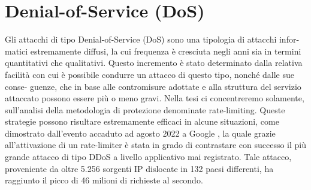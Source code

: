 \section{Denial-of-Service (DoS)}

Gli attacchi di tipo Denial-of-Service (DoS) sono una tipologia di attacchi infor- matici estremamente diffusi, la cui
frequenza è cresciuta negli anni sia in termini quantitativi che qualitativi. Questo incremento è stato determinato
dalla relativa facilità con cui è possibile condurre un attacco di questo tipo, nonché dalle sue conse- guenze, che in
base alle contromisure adottate e alla struttura del servizio attaccato possono essere più o meno gravi. Nella tesi ci
concentreremo solamente, sull’analisi della metodologia di protezione denominate rate-limiting. Queste strategie possono
risultare estremamente efficaci in alcune situazioni, come dimostrato dall’evento accaduto ad agosto 2022 a Google \cite{google_ddos},
la quale grazie all’attivazione di un rate-limiter è stata in grado di contrastare con successo il più grande attacco di tipo
DDoS a livello applicativo mai registrato. Tale attacco, proveniente da oltre 5.256 sorgenti IP dislocate in 132 paesi
differenti, ha raggiunto il picco di 46 milioni di richieste al secondo. 

